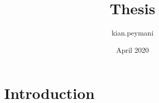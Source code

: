\documentclass{article}
\title{Thesis}
\author{kian.peymani }
\date{April 2020}
\begin{document}
\maketitle

\section{Introduction}
\end{document}
